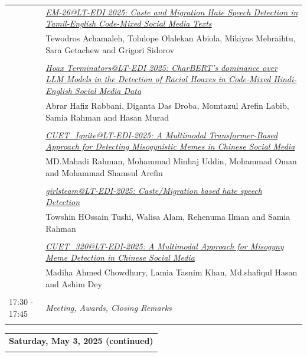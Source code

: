 \documentclass[11pt,oneside]{book}
\begin{document}
\begin{tabular}{p{24mm}p{124mm}}
                      & \hyperlink{page.152}{\emph{EM-26@LT-EDI 2025: Caste and Migration Hate Speech Detection in Tamil-English Code-Mixed Social Media Texts}}\\
        & Tewodros Achamaleh\index{Achamaleh}, Tolulope Olalekan Abiola\index{Abiola}, Mikiyas Mebraihtu\index{Mebraihtu}, Sara Getachew\index{Getachew} and Grigori Sidorov\index{Sidorov}\\\\
                
                      & \hyperlink{page.159}{\emph{Hoax Terminators@LT-EDI 2025: CharBERT's dominance over LLM Models in the Detection of Racial Hoaxes in Code-Mixed Hindi-English Social Media Data}}\\
        & Abrar Hafiz Rabbani\index{Rabbani}, Diganta Das Droba\index{Droba}, Momtazul Arefin Labib\index{Labib}, Samia Rahman\index{Rahman} and Hasan Murad\index{Murad}\\\\
                
                      & \hyperlink{page.171}{\emph{CUET\_Ignite@LT-EDI-2025: A Multimodal Transformer-Based Approach for Detecting Misogynistic Memes in Chinese Social Media}}\\
        & MD.Mahadi Rahman\index{Rahman}, Mohammad Minhaj Uddin\index{Uddin}, Mohammad Oman\index{Oman} and Mohammad Shamsul Arefin\index{Arefin}\\\\
                
                      & \hyperlink{page.177}{\emph{girlsteam@LT-EDI-2025: Caste/Migration based hate speech Detection}}\\
        & Towshin HOssain Tushi\index{Tushi}, Walisa Alam\index{Alam}, Rehenuma Ilman\index{Ilman} and Samia Rahman\index{Rahman}\\\\
                
                      & \hyperlink{page.183}{\emph{CUET\_320@LT-EDI-2025: A Multimodal Approach for Misogyny Meme Detection in Chinese Social Media}}\\
        & Madiha Ahmed Chowdhury\index{Chowdhury}, Lamia Tasnim Khan\index{Khan}, Md.shafiqul Hasan\index{Hasan} and Ashim Dey\index{Dey}\\\\
                      17:30 - 17:45 & \emph{Meeting, Awards, Closing Remarks}\\\\
      
              \end{tabular}
    \newpage
          \begin{tabular}{p{24mm}p{124mm}}
    \multicolumn{2}{l}{\bf Saturday, May 3, 2025 (continued)} \\\\
        \end{tabular}
    \newpage
      
\end{document}

